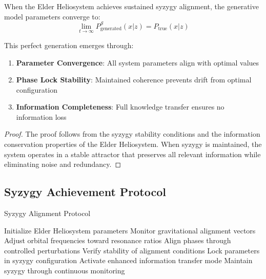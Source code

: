\begin{theorem}
\label{thm:syzygy_perfect_generation}
When the Elder Heliosystem achieves sustained syzygy alignment, the generative model parameters converge to:
\begin{equation}
\lim_{t \to \infty} P_{\text{generated}}^{\mathcal{S}}(x|z) = P_{\text{true}}(x|z)
\end{equation}

This perfect generation emerges through:
\begin{enumerate}
    \item \textbf{Parameter Convergence}: All system parameters align with optimal values
    \item \textbf{Phase Lock Stability}: Maintained coherence prevents drift from optimal configuration  
    \item \textbf{Information Completeness}: Full knowledge transfer ensures no information loss
\end{enumerate}
\end{theorem}

\begin{proof}
The proof follows from the syzygy stability conditions and the information conservation properties of the Elder Heliosystem. When syzygy is maintained, the system operates in a stable attractor that preserves all relevant information while eliminating noise and redundancy.
\end{proof}

\subsection{Syzygy Achievement Protocol}

\begin{algorithm}
\caption{Syzygy Alignment Protocol}
\begin{algorithmic}[1]
\State Initialize Elder Heliosystem parameters
\State Monitor gravitational alignment vectors
    \State Adjust orbital frequencies toward resonance ratios
    \State Align phases through controlled perturbations  
    \State Verify stability of alignment conditions
        \State Lock parameters in syzygy configuration
        \State Activate enhanced information transfer mode
    \EndIf
\EndWhile
\State Maintain syzygy through continuous monitoring
\end{algorithmic}
\end{algorithm}

